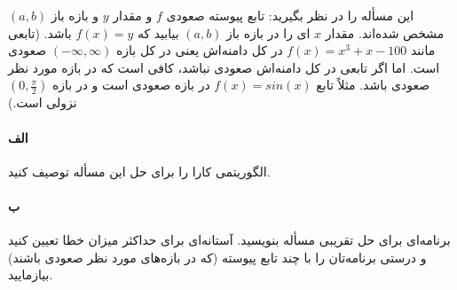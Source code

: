 \documentclass[]{article}
\begin{document}
این مسأله را در نظر بگیرید: تابع پیوسته صعودی $f$ و مقدار $y$ و بازه باز $(a, b)$ مشخص شده‌اند. 
مقدار $x$ ای را در بازه باز $(a, b)$ بیابید که $f(x) = y$ باشد.
(تابعی مانند $f(x) = x^3 + x - 100$ در کل دامنه‌اش یعنی در کل بازه $(-\infty, \infty)$ صعودی است.
اما اگر تابعی در کل دامنه‌اش صعودی نباشد، کافی است که در بازه مورد نظر صعودی باشد.
مثلاً تابع $f(x) = sin(x)$ در بازه  صعودی است و در بازه $(0, \frac{\pi}{2})$ نزولی است.)

\paragraph*{الف}
الگوریتمی کارا را برای حل این مسأله توصیف کنید.

\paragraph*{ب}
برنامه‌ای برای حل تقریبی مسأله بنویسید. 
آستانه‌ای برای حداکثر میزان خطا تعیین کنید و درستی برنامه‌تان را با چند تابع پیوسته 
(که در بازه‌های مورد نظر صعودی باشند) بیازمایید.
\end{document}
